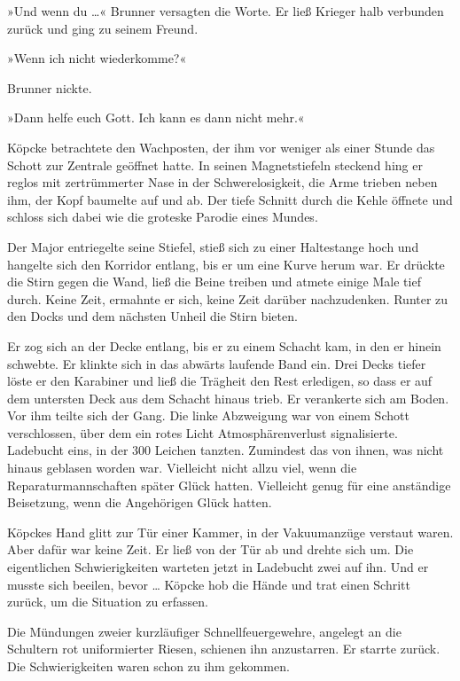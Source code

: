 »Und wenn du …« Brunner versagten die Worte. Er ließ Krieger halb
verbunden zurück und ging zu seinem Freund.

»Wenn ich nicht wiederkomme?«

Brunner nickte.

»Dann helfe euch Gott. Ich kann es dann nicht mehr.«

\tb

Köpcke betrachtete den Wachposten, der ihm vor weniger als einer
Stunde das Schott zur Zentrale geöffnet hatte. In seinen
Magnetstiefeln steckend hing er reglos mit zertrümmerter Nase in
der Schwerelosigkeit, die Arme trieben neben ihm, der Kopf baumelte
auf und ab. Der tiefe Schnitt durch die Kehle öffnete und schloss
sich dabei wie die groteske Parodie eines Mundes.

Der Major entriegelte seine Stiefel, stieß sich zu einer
Haltestange hoch und hangelte sich den Korridor entlang, bis er um
eine Kurve herum war. Er drückte die Stirn gegen die Wand, ließ die
Beine treiben und atmete einige Male tief durch. Keine Zeit,
ermahnte er sich, keine Zeit darüber nachzudenken. Runter zu den
Docks und dem nächsten Unheil die Stirn bieten.

Er zog sich an der Decke entlang, bis er zu einem Schacht kam, in
den er hinein schwebte. Er klinkte sich in das abwärts laufende
Band ein. Drei Decks tiefer löste er den Karabiner und ließ die
Trägheit den Rest erledigen, so dass er auf dem untersten Deck aus
dem Schacht hinaus trieb. Er verankerte sich am Boden. Vor ihm
teilte sich der Gang. Die linke Abzweigung war von einem Schott
verschlossen, über dem ein rotes Licht Atmosphärenverlust
signalisierte. Ladebucht eins, in der 300 Leichen tanzten.
Zumindest das von ihnen, was nicht hinaus geblasen worden war.
Vielleicht nicht allzu viel, wenn die Reparaturmannschaften später
Glück hatten. Vielleicht genug für eine anständige Beisetzung, wenn
die Angehörigen Glück hatten.

Köpckes Hand glitt zur Tür einer Kammer, in der Vakuumanzüge
verstaut waren. Aber dafür war keine Zeit. Er ließ von der Tür ab
und drehte sich um. Die eigentlichen Schwierigkeiten warteten jetzt
in Ladebucht zwei auf ihn. Und er musste sich beeilen, bevor …
Köpcke hob die Hände und trat einen Schritt zurück, um die
Situation zu erfassen.

Die Mündungen zweier kurzläufiger Schnellfeuergewehre, angelegt an
die Schultern rot uniformierter Riesen, schienen ihn anzustarren.
Er starrte zurück. Die Schwierigkeiten waren schon zu ihm
gekommen.

